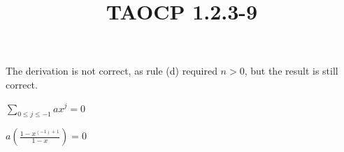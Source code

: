 \documentclass{article}
\title{TAOCP 1.2.3\mbox{-}9}
\begin{document}
\maketitle

The derivation is not correct, as rule (d) required \( n > 0 \), but the result is still correct.

\( \sum_{0 \leq j \leq -1} ax^{j} = 0 \)

\( a(\frac{1-x^{(-1)+1}}{1-x}) = 0 \)
\end{document}
